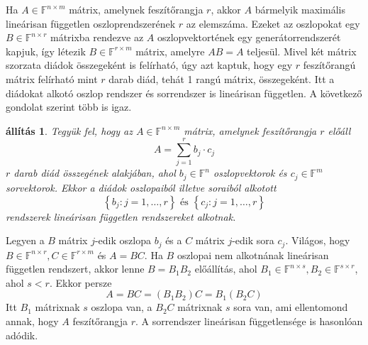 \documentclass[9pt, a4paper, showtrims]{memoir}
\makeatletter
\renewenvironment{proof}[1][\proofname]
    {\par\pushQED{\qed}%
    \normalfont \topsep6\p@\@plus6\p@\relax
    \trivlist
    \item[\hskip\labelsep
        \itshape
    #1\@addpunct{:}]\ignorespaces}
    {\popQED\endtrivlist\@endpefalse}
\theoremstyle{plain}
\newtheorem{proposition}{állítás}[chapter]
\theoremstyle{remark}
\theoremstyle{definition}
\makeatother
\begin{document}
Ha $A\in\mathbb{F}^{n\times m}$ mátrix, amelynek feszítőrangja $r$, 
akkor $A$ bármelyik maximális lineárisan független oszloprendszerének $r$ az elemszáma.
Ezeket az oszlopokat egy $B\in\mathbb{F}^{n\times r}$ mátrixba rendezve az $A$ oszlopvektortének
egy generátorrendszerét kapjuk, 
így létezik $B\in\mathbb{F}^{r\times m}$ mátrix, amelyre $AB=A$ teljesül.
Mivel két mátrix szorzata diádok összegeként is felírható, 
úgy azt kaptuk, hogy egy $r$ feszítőrangú mátrix felírható mint $r$ darab diád,
tehát 1 rangú mátrix, összegeként. 
Itt a diádokat alkotó oszlop rendszer és sorrendszer is lineárisan független.
A következő gondolat szerint több is igaz.
\begin{proposition}
    Tegyük fel, hogy az $A\in\mathbb{F}^{n\times m}$ mátrix, amelynek feszítőrangja $r$ előáll
    \[
    A=\sum_{j=1}^rb_j\cdot c_j
    \]
    $r$ darab diád összegének alakjában, 
    ahol $b_j\in\mathbb{F}^n$ oszlopvektorok és $c_j\in\mathbb{F}^m$ sorvektorok.
    Ekkor a diádok oszlopaiból illetve soraiból alkotott 
    \[
        \left\{ b_j:j=1,\dots,r \right\} \text{ és }
        \left\{ c_j:j=1,\dots,r \right\}
    \] 
    rendszerek lineárisan független rendszereket alkotnak.
\end{proposition}
\begin{proof}
    Legyen a $B$ mátrix $j$-edik oszlopa $b_j$ és a $C$ mátrix $j$-edik sora $c_j$.
    Világos, hogy $B\in\mathbb{F}^{n\times r}, C\in\mathbb{F}^{r\times m}$ és 
    $A=BC$.
    Ha $B$ oszlopai nem alkotnának lineárisan független rendszert, akkor 
    lenne $B=B_1B_2$ előállítás, 
    ahol $B_1\in\mathbb{F}^{n\times s}, B_2\in\mathbb{F}^{s\times r}$,
    ahol $s<r$.
    Ekkor persze
    \[
        A=BC=\left( B_1B_2 \right)C=B_1\left( B_2C \right)
    \]
    Itt $B_1$ mátrixnak $s$ oszlopa van, a
    $B_2C$ mátrixnak $s$ sora van,
    ami ellentomond annak, hogy $A$ feszítőrangja $r$.
    A sorrendszer lineárisan függetlensége is hasonlóan adódik.
\end{proof}
\end{document}

